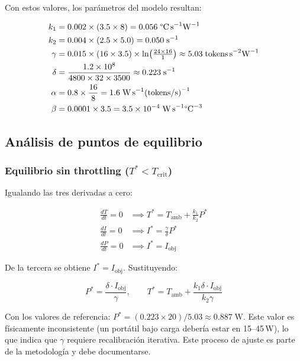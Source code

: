 \documentclass[10pt, twocolumn]{article}
\begin{document}
Con estos valores, los parámetros del modelo resultan:

\begin{align*}
  k_1 &= 0.002 \times (3.5 \times 8) = 0.056\;\text{\textdegree C\,s}^{-1}\text{W}^{-1}\\
  k_2 &= 0.004 \times (2.5 \times 5.0) = 0.050\;\text{s}^{-1}\\
  \gamma &= 0.015 \times (16 \times 3.5) \times \ln\!\left(\tfrac{24 \times 16}{1}\right)
           \approx 5.03\;\text{tokens\,s}^{-2}\text{W}^{-1}\\
  \delta &= \frac{1.2\times10^{8}}{4800 \times 32 \times 3500} \approx 0.223\;\text{s}^{-1}\\
  \alpha &= 0.8 \times \frac{16}{8} = 1.6\;\text{W\,s}^{-1}\text{(tokens/s)}^{-1}\\
  \beta  &= 0.0001 \times 3.5 = 3.5\times10^{-4}\;\text{W\,s}^{-1}\text{\textdegree C}^{-3}
\end{align*}

\subsection{Análisis de puntos de equilibrio}

\subsubsection{Equilibrio sin throttling ($T^* < T_{\text{crit}}$)}

Igualando las tres derivadas a cero:

\begin{align*}
  \frac{dT}{dt}=0 &\implies T^* = T_{\text{amb}} + \frac{k_1}{k_2} P^* \\
  \frac{dI}{dt}=0 &\implies I^* = \frac{\gamma}{\delta} P^* \\
  \frac{dP}{dt}=0 &\implies I^* = I_{\text{obj}}
\end{align*}

De la tercera se obtiene $I^* = I_{\text{obj}}$. Sustituyendo:

\begin{equation}
  P^* = \frac{\delta \cdot I_{\text{obj}}}{\gamma}, \qquad
  T^* = T_{\text{amb}} + \frac{k_1 \delta \cdot I_{\text{obj}}}{k_2 \gamma}
\end{equation}

\begin{notacal}
Con los valores de referencia: $P^* = (0.223 \times 20)/5.03 \approx 0.887\;\text{W}$.
Este valor es físicamente inconsistente (un portátil bajo carga debería estar en
15--45\,W), lo que indica que $\gamma$ requiere recalibración iterativa. Este
proceso de ajuste es parte de la metodología y debe documentarse.
\end{notacal}
\end{document}
